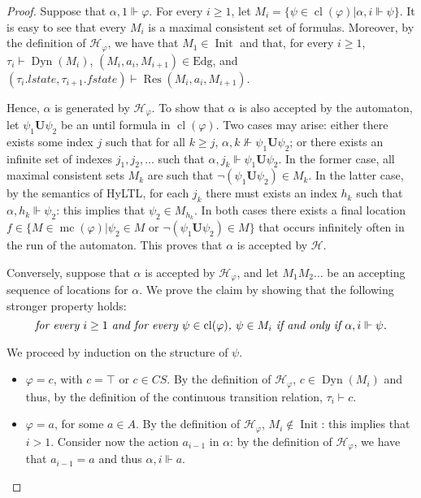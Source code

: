 \documentclass[submission,copyright,creativecommons]{eptcs}
\newcommand{\hyltl}{\textsf{HyLTL}\xspace}
\newcommand{\U}{\ensuremath{\mathbin{\mathbf{U}}}\xspace}
\newcommand{\fcs}{\ensuremath{CS}\xspace}
\newcommand{\mmodels}{\Vdash}
\newcommand{\cmodels}{\vdash}
\DeclareMathOperator{\cl}{cl}
\DeclareMathOperator{\cs}{mc}
\newcommand{\autH}{\mathcal{H}}
\newcommand{\Edg}{\mathrm{Edg}}
\DeclareMathOperator{\Dyn}{{Dyn}}
\DeclareMathOperator{\Res}{{Res}}
\DeclareMathOperator{\Init}{{Init}}
\newcommand{\fstate}{\mathit{fstate}}
\newcommand{\lstate}{\mathit{lstate}}
\begin{document}
\begin{proof}
Suppose that $\alpha, 1 \mmodels \varphi$. For every $i \geq 1$, let $M_i = \{\psi\in \cl(\varphi) | \alpha,i \mmodels \psi\}$. It is easy to see that every $M_i$ is a maximal consistent set of formulas. Moreover, by the definition of $\autH_\varphi$, we have that $M_1 \in \Init$ and that, for every $i \geq 1$, $\tau_i \cmodels \Dyn(M_i)$,
$(M_i, a_i, M_{i+1}) \in \Edg$, and $(\tau_i.\lstate,\tau_{i+1}.\fstate) \cmodels \Res(M_i, a_i, M_{i+1})$.

Hence, $\alpha$ is generated by $\autH_\varphi$. To show that $\alpha$ is also accepted by the automaton, let $\psi_1 \U \psi_2$ be an until formula in $\cl(\varphi)$. Two cases may arise: either there exists some index $j$ such that for all $k \geq j$, $\alpha,k\not\mmodels \psi_1 \U \psi_2$; or there exists an infinite set of indexes $j_1, j_2, \ldots$ such that $\alpha,{j_k}\mmodels \psi_1 \U \psi_2$. In the former case, all maximal consistent sets $M_k$ are such that $\neg(\psi_1 \U \psi_2) \in M_k$. In the latter case, by the semantics of \hyltl, for each $j_k$ there must exists an index $h_k$ such that $\alpha,{h_k}\mmodels \psi_2$: this implies that $\psi_2\in M_{h_k}$. In both cases there exists a final location $f \in \{M \in \cs(\varphi) | \psi_2 \in M$ or $\neg(\psi_1 \U \psi_2) \in M\}$ that occurs infinitely often in the run of the automaton. This proves that $\alpha$ is accepted by $\autH$.

\medskip

Conversely, suppose that $\alpha$ is accepted by $\autH_\varphi$, and let $M_1 M_2 \ldots$ be an accepting sequence of locations for $\alpha$. We prove the claim by showing that the following stronger property holds:
\begin{equation}\label{eq:strongerprop}
\text{\it for every $i \geq 1$ and for every $\psi\in\cl(\varphi)$, $\psi \in M_i$ if and only if $\alpha,i \mmodels \psi$.}
\end{equation}
 
\noindent We proceed by induction on the structure of $\psi$.

\begin{itemize}
	\item $\varphi = c$, with $c = \top$ or $c \in \fcs$. By the definition of $\autH_\varphi$, $c \in \Dyn(M_i)$ and thus, by the definition of the continuous transition relation, $\tau_i \cmodels c$.
	
	\item $\varphi = a$, for some $a \in A$. By the definition of $\autH_\varphi$, $M_i \not\in \Init$: this implies that $i > 1$. Consider now the action $a_{i-1}$ in $\alpha$: by the definition of $\autH_\varphi$, we have that $a_{i-1} = a$ and thus $\alpha,i\mmodels a$.
	

\end{itemize}
\end{proof}
\end{document}
